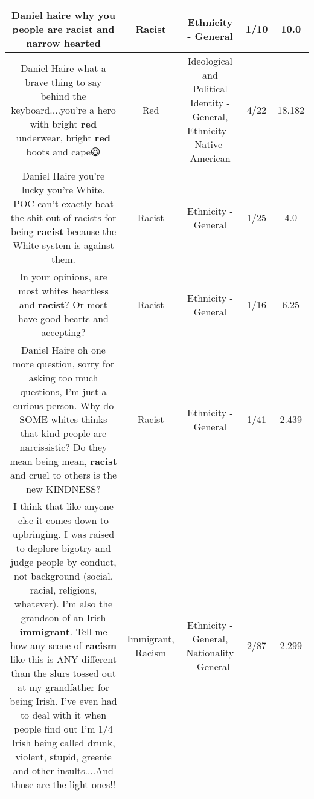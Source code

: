 \documentclass[11pt]{article}
\newlength\mylength
\begin{document}
\begin{center}
\begin{longtable}{|C{.65\mylength}|C{.30\mylength}|C{.12\mylength}|C{.12\mylength}|C{.12\mylength}|}
  \small Daniel haire why you people are \textbf{racist} and narrow hearted\normalsize   & Racist & Ethnicity - General & 1/10 & 10.0 \\  \hline
  \small Daniel Haire what a brave thing to say behind the keyboard....you're a  hero with bright \textbf{r\textbf{ed}} underwear, bright \textbf{r\textbf{ed}} boots and cape😆\normalsize   & Red &  Ideological and Political Identity - General, Ethnicity - Native-American & 4/22 & 18.182 \\  \hline
  \small Daniel Haire you're lucky you're White. POC can't exactly beat the shit out of racists for being \textbf{racist} because the White system is against them.\normalsize   & Racist & Ethnicity - General & 1/25 & 4.0 \\  \hline
  \small In your opinions,  are most whites heartless and \textbf{racist}? Or most have good hearts and accepting?\normalsize   & Racist & Ethnicity - General & 1/16 & 6.25 \\  \hline
  \small Daniel Haire oh  one more question, sorry for asking too much questions, I'm just a curious person. Why do SOME whites thinks that kind people are narcissistic? Do they mean being mean, \textbf{racist}  and cruel to others is the new KINDNESS?\normalsize   & Racist & Ethnicity - General & 1/41 & 2.439 \\  \hline
  \small I think that like anyone else it comes down to upbringing.  I was raised to deplore bigotry and judge people by conduct, not background (social, racial, religions, whatever).  I'm also the grandson of an Irish \textbf{immigrant}.  Tell me how any scene of \textbf{racism} like this is ANY different than the slurs tossed out at my grandfather for being Irish.  I've even had to deal with it when people find out I'm 1/4 Irish being called drunk, violent, stupid, greenie and other insults....And those are the light ones!!\normalsize   & Immigrant, Racism & Ethnicity - General, Nationality - General & 2/87 & 2.299 \\  \hline

\end{longtable}
\end{center}
\end{document}
